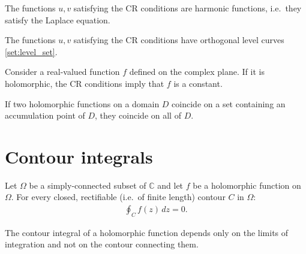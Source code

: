     \begin{property}
        The functions $u,v$ satisfying the CR conditions are harmonic functions, i.e.~they satisfy the Laplace equation.
    \end{property}
    \begin{property}
        The functions $u,v$ satisfying the CR conditions have orthogonal level curves \ref{set:level_set}.
    \end{property}

    \begin{property}
        Consider a real-valued function $f$ defined on the complex plane. If it is holomorphic, the CR conditions imply that $f$ is a constant.
    \end{property}

    \begin{theorem}
        If two holomorphic functions on a domain $D$ coincide on a set containing an accumulation point of $D$, they coincide on all of $D$.
    \end{theorem}

\section{Contour integrals}



    \begin{theorem}\label{complex:cauchy_integral_theorem}
        Let $\Omega$ be a simply-connected subset of $\mathbb{C}$ and let $f$ be a holomorphic function on $\Omega$. For every closed, rectifiable (i.e.~of finite length) contour $C$ in $\Omega$:
        \begin{gather}
            \oint_Cf(z)\,dz = 0.
        \end{gather}
    \end{theorem}
    \begin{result}
        The contour integral of a holomorphic function depends only on the limits of integration and not on the contour connecting them.
    \end{result}


